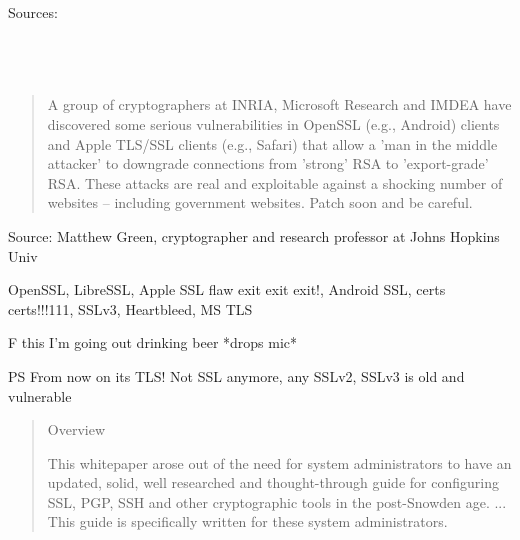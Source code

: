 \documentclass[20pt,landscape,a4paper,footrule]{foils}
\begin{document}
{\tiny Sources:\\
\\
\\
\\
}




\begin{quote}
A group of cryptographers at INRIA, Microsoft Research and IMDEA have discovered some serious vulnerabilities in OpenSSL (e.g., Android) clients and Apple TLS/SSL clients (e.g., Safari) that allow a 'man in the middle attacker' to downgrade connections from 'strong' RSA to 'export-grade' RSA. These attacks are real and exploitable against a shocking number of websites -- including government websites. Patch soon and be careful. 
\end{quote}

Source: Matthew Green, cryptographer and research professor at Johns Hopkins Univ\\
{\footnotesize{}
  
}


OpenSSL, LibreSSL, Apple SSL flaw exit exit exit!, Android SSL, certs certs!!!111, SSLv3, Heartbleed, MS TLS

\vskip 1cm
\centerline{F this I'm going out drinking beer *drops mic*}

 

\vskip 1cm
PS From now on its TLS! Not SSL anymore, any SSLv2, SSLv3 is old and vulnerable



\begin{quote}
Overview

This whitepaper arose out of the need for system administrators to have an updated, solid, well researched and thought-through guide for configuring SSL, PGP, SSH and other cryptographic tools in the post-Snowden age. ... This guide is specifically written for these system administrators. 
\end{quote}

\end{document}
